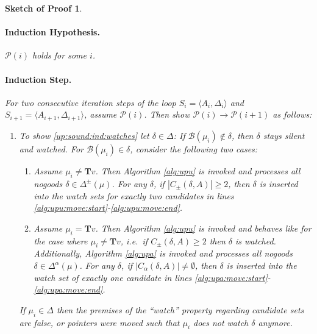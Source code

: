 \documentclass[final]{vutinfth} %
\newtheorem{proof-sketch}{Sketch of Proof}[chapter]
\newcommand{\bpro}{\mathcal{B}}
\newcommand{\ass}{A}
\newcommand{\bT}{\mathbf{T}}
\newcommand{\cdpm}{C_\pm}
\newcommand{\cdal}{C_\alpha}
\newcommand{\dpm}{\Delta^\pm}
\newcommand{\dal}{\Delta^\alpha}
\newcommand{\sgl}{\mu}
\begin{document}
\begin{proof-sketch}
\paragraph{Induction Hypothesis.} $\mathcal{P}(i)$ holds for some $i$.

\paragraph{Induction Step.} For two consecutive iteration steps of the loop $S_{i} = \langle \ass_{i}, \Delta_{i} \rangle$ and $S_{i+1} = \langle \ass_{i+1}, \Delta_{i+1} \rangle$, assume $\mathcal{P}(i)$. Then show $\mathcal{P}(i) \to \mathcal{P}(i + 1)$ as follows:%

\begin{enumerate}
\item To show \ref{up:sound:ind:watches} let $\delta \in \Delta$: %
If $\bpro(\sgl_i) \not \in \delta$, then $\delta$ stays silent and watched. For $\bpro(\sgl_i) \in \delta$, consider the following two cases:
\begin{enumerate}
	\item Assume $\sgl_i \not = \bT v$. Then Algorithm \ref{alg:upu} is invoked and processes all nogoods $\delta \in \dpm(\sgl)$. For any $\delta$, if $|\cdpm(\delta, A)| \geq 2$, then $\delta$ is inserted into the watch sets for exactly two candidates in lines \ref{alg:upu:move:start}-\ref{alg:upu:move:end}.
	\item Assume $\sgl_i = \bT v$. Then Algorithm \ref{alg:upu} is invoked and behaves like for the case where $\sgl_i \not = \bT v$, i.e.~if $\cdpm(\delta,\ass) \geq 2$ then $\delta$ is watched. Additionally, Algorithm \ref{alg:upa} is invoked and processes all nogoods $\delta \in \dal(\sgl)$. For any $\delta$, if $|\cdal(\delta, A)| \not = \emptyset$, then $\delta$ is inserted into the watch set of exactly one candidate in lines \ref{alg:upa:move:start}-\ref{alg:upa:move:end}. 
\end{enumerate}

If $\sgl_i \in \Delta$ then the premises of the \enquote{watch} property regarding candidate sets are false, or pointers were moved such that $\sgl_i$ does not watch $\delta$ anymore.


\end{enumerate}
\end{proof-sketch}
\end{document}
